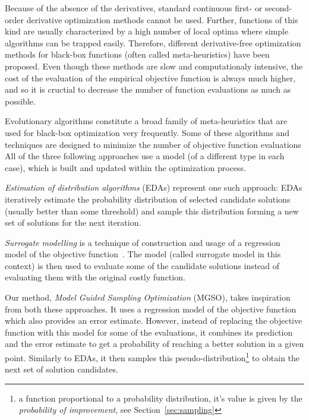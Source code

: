 \documentclass{itatnew}
\begin{document}
Because of the absence of the derivatives, standard continuous first- or second-order derivative optimization methods cannot be used. Further, functions of this kind are usually characterized by a high number of local optima where simple algorithms can be trapped easily. Therefore, different derivative-free optimization methods for black-box functions (often called meta-heuristics) have been proposed. Even though these methods are slow and computationaly intensive, the cost of the evaluation of the empirical objective function is always much higher, and so it is cructial to decrease the number of function evaluations as much as possible.

Evolutionary algorithms constitute a broad family of meta-heuristics that are used for black-box optimization very frequently. Some of these algorithms and techniques are designed to minimize the number of objective function evaluations 
All of the three following approaches use a model (of a different type in each case), which is built and updated within the optimization process.

\emph{Estimation of distribution algorithms} (EDAs) \cite{larranaga_estimation_2002} represent one such approach: EDAs iteratively estimate the probability distribution of selected candidate solutions (usually better than some threshold) and sample this distribution forming a new set of solutions for the next iteration. 

\emph{Surrogate modelling} is a technique of construction and usage of a regression model of the objective function~\cite{jin_comprehensive_2005}. The model (called surrogate model in this context) is then used to evaluate some of the candidate solutions instead of evaluating them with the original costly function.

Our method, \emph{Model Guided Sampling Optimization} (MGSO), takes inspiration from both these approaches. It uses a regression model of the objective function which also provides an error estimate. However, instead of replacing the objective function with this model for some of the evaluations, it combines its prediction and the error estimate to get a probability of reaching a better solution in a given point. Similarly to EDAs, it then samples this pseudo-distribution\footnote{a function proportional to a probability distribution, it's value is given by the \emph{probability of improvement}, see Section~\ref{sec:sampling}} to obtain the next set of solution candidates.
\end{document}
